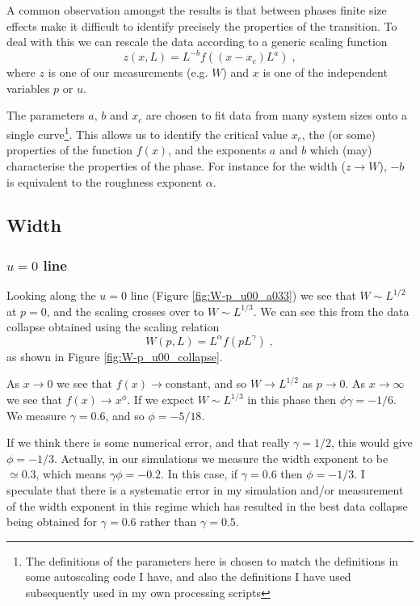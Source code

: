 \documentclass[a4paper,10pt]{article}
\newcommand{\fref}[1]{Figure \ref{#1}}
\begin{document}
A common observation amongst the results is that between phases finite size effects make it difficult to identify precisely the properties of the transition. To deal with this we can rescale the data according to a generic scaling function
\begin{equation}
 z(x,L) = L^{-b} f((x-x_c)L^a) \;,
\end{equation}
where $z$ is one of our measurements (e.g. $W$) and $x$ is one of the independent variables $p$ or $u$. 

The parameters $a$, $b$ and $x_c$ are chosen to fit data from many system sizes onto a single curve\footnote{The definitions of the parameters here is chosen to match the definitions in some autoscaling code I have, and also the definitions I have used subsequently used in my own processing scripts}. This allows us to identify the critical value $x_c$, the (or some) properties of the function $f(x)$, and the exponents $a$ and $b$ which (may) characterise the properties of the phase. For instance for the width ($z\to W$), $-b$ is equivalent to the roughness exponent $\alpha$. 

\newpage
\subsection{Width}

\subsubsection{$u=0$ line}

Looking along the $u=0$ line (\fref{fig:W-p_u00_a033}) we see that $W \sim L^{1/2}$ at $p=0$, and the scaling crosses over to $W\sim L^{1/3}$. We can see this from the data collapse obtained using the scaling relation
\begin{equation}
 W(p,L) = L^{\alpha} f(pL^\gamma) \;,
\end{equation}
as shown in \fref{fig:W-p_u00_collapse}.

As $x\to0$ we see that $f(x)\to \mbox{constant}$, and so $W\to L^{1/2}$ as $p\to 0$. As $x\to\infty$ we see that $f(x)\to x^\phi$. If we expect $W\sim L^{1/3}$ in this phase then $\phi\gamma = -1/6$. We measure $\gamma = 0.6$, and so $\phi = -5/18$. 

If we think there is some numerical error, and that really $\gamma = 1/2$, this would give $\phi = -1/3$. Actually, in our simulations we measure the width exponent to be $\simeq 0.3$, which means $\gamma\phi = -0.2$. In this case, if $\gamma = 0.6$ then $\phi = -1/3$. I speculate that there is a systematic error in my simulation and/or measurement of the width exponent in this regime which has resulted in the best data collapse being obtained for $\gamma = 0.6$ rather than $\gamma = 0.5$.
\newline
\end{document}
